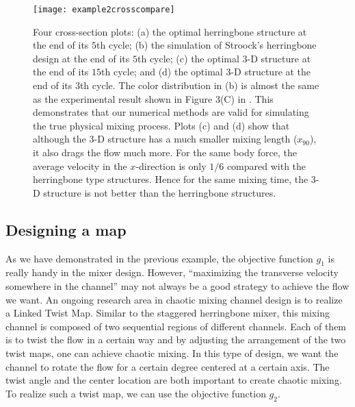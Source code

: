   \begin{figure}
    \centerline{
     \texttt{[image: example2crosscompare]}
    }
    \caption{\label{example2crosscompare} Four cross-section plots: (a) the optimal herringbone structure at the end of its $5$th cycle; (b) the simulation of Stroock's herringbone design at the end of its $5$th cycle; (c) the optimal $3$-D structure at the end of its $15$th cycle; and (d) the optimal $3$-D structure at the end of its $3$th cycle. The color distribution in (b) is almost the same as the experimental result shown in Figure 3(C) in \cite{Stroock2002}. This demonstrates that our numerical methods are valid for simulating the true physical mixing process. Plots (c) and (d) show that although the $3$-D structure has a much smaller mixing length ($x_{90}$), it also drags the flow much more. For the same body force, the average velocity in the $x$-direction is only $1/6$ compared with the herringbone type structures. Hence for the same mixing time, the $3$-D structure is not better than the herringbone structures.}
  \end{figure}




\subsection{Designing a map}
As we have demonstrated in the previous example, the objective
function $g_1$ is really handy in the mixer design. However,
``maximizing the transverse velocity somewhere in the channel'' may
not always be a good strategy to achieve the flow we want. An ongoing
research area in chaotic mixing channel design is to realize a Linked Twist
Map. Similar to the staggered herringbone mixer, this mixing channel
is composed of two sequential regions of different channels. Each of
them is to twist the flow in a certain way and by adjusting the
arrangement of the two twist maps, one can achieve chaotic mixing. In
this type of design, we want the channel to rotate the flow for a
certain degree centered at a certain axis. The twist angle and the center
location are both important to create chaotic mixing. To realize such
a twist map, we can use the objective function $g_2$.


